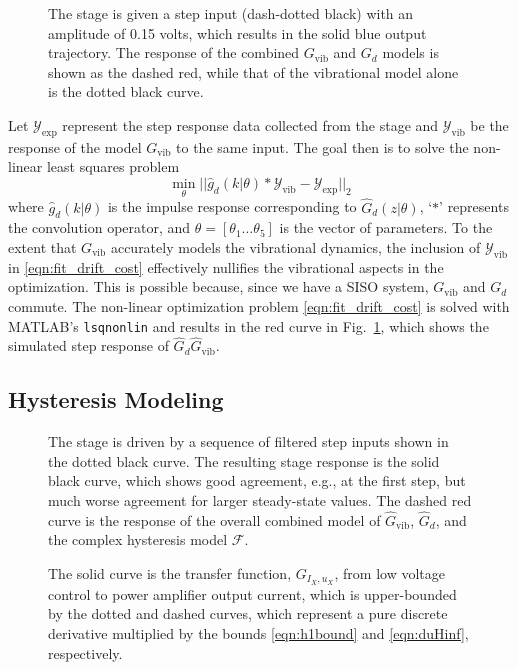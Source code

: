 \documentclass[twocolumn,twoside]{IEEEtran}
\newcommand{\Gv}{\ensuremath{G_{\text{vib}}}\xspace}
\newcommand{\hGv}{\ensuremath{\hat{G}_{\text{vib}}}\xspace}
\begin{document}
\begin{figure}
  
  \caption{The stage is given a step input (dash-dotted black) with an amplitude of 0.15 volts, which results in the solid blue output trajectory. The response of the combined $\Gv$ and $G_{d}$ models is shown as the dashed red, while that of the vibrational model alone is the dotted black curve.}
  \label{fig:drift_fit}
\end{figure}
Let $\mathcal{Y}_{\text{exp}}$ represent the step response data collected from the stage and  $\mathcal{Y}_{\text{vib}}$ be the response of the model $\Gv$ to the same input. The goal then is to solve the non-linear least squares problem
\begin{equation}
  \min_{\theta}\bigl|\bigl| \hat{g}_d(k|\theta)*\mathcal{Y}_{\text{vib}} - \mathcal{Y}_{\text{exp}}\bigr|\bigr|_2
  \label{eqn:fit_drift_cost}
\end{equation}
where $\hat{g}_d(k|\theta)$ is the impulse response corresponding to $\hat{G}_d(z|\theta)$, `$*$' represents the convolution operator, and  ${\theta=[\theta_1\dots\theta_5]}$ is the vector of parameters. To the extent that $\Gv$ accurately models the vibrational dynamics, the inclusion of $\mathcal{Y}_{\text{vib}}$ in \eqref{eqn:fit_drift_cost} effectively nullifies the vibrational aspects in the optimization. This is possible because, since we have a SISO system, $\Gv$ and $G_d$ commute. 
The non-linear optimization problem \eqref{eqn:fit_drift_cost} is solved with MATLAB's \texttt{lsqnonlin} and results in the red curve in Fig.~\ref{fig:drift_fit}, which shows the simulated step response of $\hat{G}_d\hGv$. 

\subsection{Hysteresis Modeling}\label{sec:hyst_model}
\begin{figure*}[h!]
  \begin{minipage}{0.48\textwidth}
  
  \caption{The stage is driven by a sequence of filtered step inputs shown in the dotted black curve. The resulting stage response is the solid black curve, which shows good agreement, e.g., at the first step, but much worse agreement for larger steady-state values. The dashed red curve is the response of the overall combined model of $\hGv$, $\hat{G}_{d}$, and the complex hysteresis model $\mathcal{F}$.}
  \label{fig:hyst_resp_dem}
\end{minipage}
\hfill
\begin{minipage}{0.48\textwidth}
\centering

\caption{ The solid curve is the transfer function, $G_{I_X, u_X}$, from low voltage control to power amplifier output current, which is upper-bounded by the dotted and dashed curves, which represent a pure discrete derivative multiplied by the bounds \eqref{eqn:h1bound} and \eqref{eqn:duHinf}, respectively.}
\label{fig:powTF}
\end{minipage}
\end{figure*}
\end{document}
